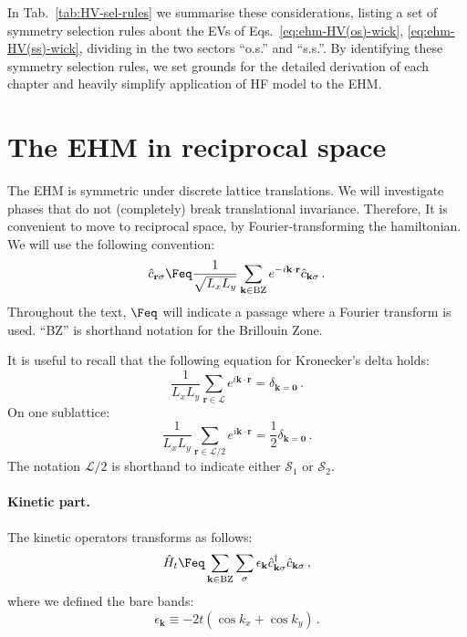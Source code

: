 In Tab.~\ref{tab:HV-sel-rules} we summarise these considerations, listing a set of symmetry selection rules about the EVs of Eqs.~\eqref{eq:ehm-HV(os)-wick}, \eqref{eq:ehm-HV(ss)-wick}, dividing in the two sectors ``o.s.'' and ``s.s.''. By identifying these symmetry selection rules, we set grounds for the detailed derivation of each chapter and heavily simplify application of HF model to the EHM.

\section{The EHM in reciprocal space}

The EHM is symmetric under discrete lattice translations. We will investigate phases that do not (completely) break translational invariance. Therefore, It is convenient to move to reciprocal space, by Fourier-transforming the hamiltonian. We will use the following convention:
\begin{equation}\label{eq:fourier-convention}
	\hat c_{\mathbf{r}\sigma} \Feq \frac{1}{\sqrt{L_xL_y}} \sum_{\mathbf{k} \in \mathrm{BZ}} e^{-i \mathbf{k} \cdot \mathbf{r}} \hat c_{\mathbf{k}\sigma} \, .
\end{equation}
Throughout the text, $\Feq$ will indicate a passage where a Fourier transform is used. ``BZ'' is shorthand notation for the Brillouin Zone.

It is useful to recall that the following equation for Kronecker's delta holds:
\begin{equation}\label{eq:ehm-delta}
	\frac{1}{L_x L_y} \sum_{\mathbf{r} \in \mathcal{L}} e^{i \mathbf{k} \cdot \mathbf{r}} = \delta_{\mathbf{k}=\mathbf{0}} \, .
\end{equation}
On one  sublattice:
\begin{equation}\label{eq:ehm-delta/2}
	\frac{1}{L_x L_y} \sum_{\mathbf{r} \in \mathcal{L}/2} e^{i \mathbf{k} \cdot \mathbf{r}} = \frac{1}{2} \delta_{\mathbf{k}=\mathbf{0}} \, .
\end{equation}
The notation $\mathcal{L}/2$ is shorthand to indicate either $\mathcal{S}_1$ or $\mathcal{S}_2$.

\paragraph{Kinetic part.}

The kinetic operators transforms as follows:
\begin{equation}\label{eq:Ht-Fourier}
	\hat H_t \Feq \sum_{\mathbf{k} \in \mathrm{BZ}} \sum_\sigma \epsilon_\mathbf{k} \hat c_{\mathbf{k}\sigma}^\dagger \hat c_{\mathbf{k}\sigma} \, ,
\end{equation}
where we defined the bare bands: 
\begin{equation}\label{eq:bare-bands}
	\epsilon_\mathbf{k} \equiv -2t \left(
	\cos k_x + \cos k_y
	\right) \, .
\end{equation}

